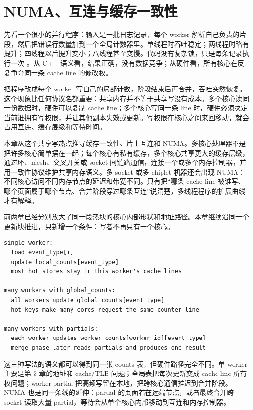 \chapter{NUMA、互连与缓存一致性}

先看一个很小的并行程序：输入是一批日志记录，每个 worker 解析自己负责的片段，然后把错误行数量加到一个全局计数器里。单线程时吞吐稳定；两线程时略有提升；四线程以后提升变小；八线程甚至变慢。代码没有复杂锁，只是每条记录执行一次 。从 C++ 语义看，结果正确，没有数据竞争；从硬件看，所有核心在反复争夺同一条 cache line 的修改权。

把程序改成每个 worker 写自己的局部计数，阶段结束后再合并，吞吐突然恢复。这个现象比任何协议名都重要：共享内存并不等于共享写没有成本。多个核心读同一份数据时，硬件可以复制 cache line；多个核心写同一条 line 时，硬件必须决定当前谁拥有写权限，并让其他副本失效或更新。写权限在核心之间来回移动，就会占用互连、缓存层级和等待时间。

本章从这个共享写热点推导缓存一致性、片上互连和 NUMA。多核心处理器不是把许多核心简单摆在一起；每个核心有私有缓存，多个核心共享更大的缓存层级，通过环、mesh、交叉开关或 socket 间链路通信，连接一个或多个内存控制器，并用一致性协议维护共享内存语义。多 socket 或多 chiplet 机器还会出现 NUMA：不同核心访问不同内存节点的延迟和带宽不同。只有把“哪条 cache line 被谁写、哪个页面属于哪个节点、合并阶段穿过哪条互连”说清楚，多线程程序的扩展曲线才有解释。

前两章已经分别放大了同一段热块的核心内部形状和地址路径。本章继续沿同一个更新块推进，只新增一个条件：写者不再只有一个核心。

\begin{lstlisting}[numbers=none,caption={同一更新块进入多核心后的新问题}]
single worker:
  load event_type[i]
  update local_counts[event_type]
  most hot stores stay in this worker's cache lines

many workers with global_counts:
  all workers update global_counts[event_type]
  hot keys make many cores request the same counter line

many workers with partials:
  each worker updates worker_counts[worker_id][event_type]
  merge phase later reads partials and produces one result
\end{lstlisting}

这三种写法的语义都可以得到同一张 counts 表，但硬件路径完全不同。单 worker 主要是第 3 章的地址和 cache/TLB 问题；全局表把每次更新变成 cache line 所有权问题；worker partial 把高频写留在本地，把跨核心通信推迟到合并阶段。NUMA 也是同一条线的延伸：partial 的页面若在远端节点，或者最终合并跨 socket 读取大量 partial，等待会从单个核心内部移动到互连和内存控制器。


